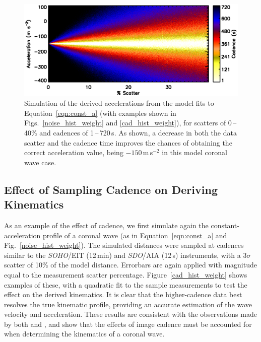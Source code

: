 \documentclass[structabstract]{aa}
\begin{document}
\begin{figure}[!b]
\begin{center}
\includegraphics[scale=0.53, trim=20 10 0 20]{images/fig_noise_cad.eps}
\caption{Simulation of the derived accelerations from the model fits to Equation~\ref{eqn:const_a} (with examples shown in Figs.~\ref{noise_hist_weight} and \ref{cad_hist_weight}), for scatters of 0\,--\,40\% and cadences of 1\,--\,720\,s. As shown, a decrease in both the data scatter and the cadence time improves the chances of obtaining the correct acceleration value, being $-150$\,m\,s$^{-2}$ in this model coronal wave case.}
\label{noise_test_image}
\end{center}
\end{figure}


\subsection{Effect of Sampling Cadence on Deriving Kinematics}
\label{subsect:cadence}

As an example of the effect of cadence, we first simulate again the constant-acceleration profile of a coronal wave (as in Equation~\ref{eqn:const_a} and Fig.~\ref{noise_hist_weight}). The simulated distances were sampled at cadences similar to the \emph{SOHO}/EIT (12\,min) and \emph{SDO}/AIA (12\,s) instruments, with a $3\sigma$ scatter of 10\% of the model distance. Errorbars are again applied with magnitude equal to the measurement scatter percentage. Figure~\ref{cad_hist_weight} shows examples of these, with a quadratic fit to the sample measurements to test the effect on the derived kinematics. It is clear that the higher-cadence data best resolves the true kinematic profile, providing an accurate estimation of the wave velocity and acceleration. These results are consistent with the observations made by both \citet{2008ApJ...680L..81L} and \citet{2009ApJ...707..503M}, and show that the effects of image cadence must be accounted for when determining the kinematics of a coronal wave.
\end{document}
